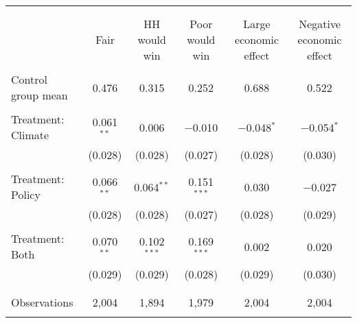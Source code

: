 
\begin{tabular}{@{\extracolsep{5pt}}lccccc} 
\\[-1.8ex]\hline 
\hline \\[-1.8ex] 
\\[-1.8ex] & Fair & HH would win & Poor would win & Large economic effect & Negative economic effect \\ 
\hline \\[-1.8ex] 
 Control group mean & 0.476 & 0.315 & 0.252 & 0.688 & 0.522  \\ \hline \\[-1.8ex] Treatment: Climate & 0.061$^{**}$ & 0.006 & $-$0.010 & $-$0.048$^{*}$ & $-$0.054$^{*}$ \\ 
  & (0.028) & (0.028) & (0.027) & (0.028) & (0.030) \\ 
  & & & & & \\ 
 Treatment: Policy & 0.066$^{**}$ & 0.064$^{**}$ & 0.151$^{***}$ & 0.030 & $-$0.027 \\ 
  & (0.028) & (0.028) & (0.027) & (0.028) & (0.029) \\ 
  & & & & & \\ 
 Treatment: Both & 0.070$^{**}$ & 0.102$^{***}$ & 0.169$^{***}$ & 0.002 & 0.020 \\ 
  & (0.029) & (0.029) & (0.028) & (0.029) & (0.030) \\ 
  & & & & & \\ 
\hline \\[-1.8ex] 

Observations & 2,004 & 1,894 & 1,979 & 2,004 & 2,004 \\ 
\hline 
\hline \\[-1.8ex] 
\end{tabular} 